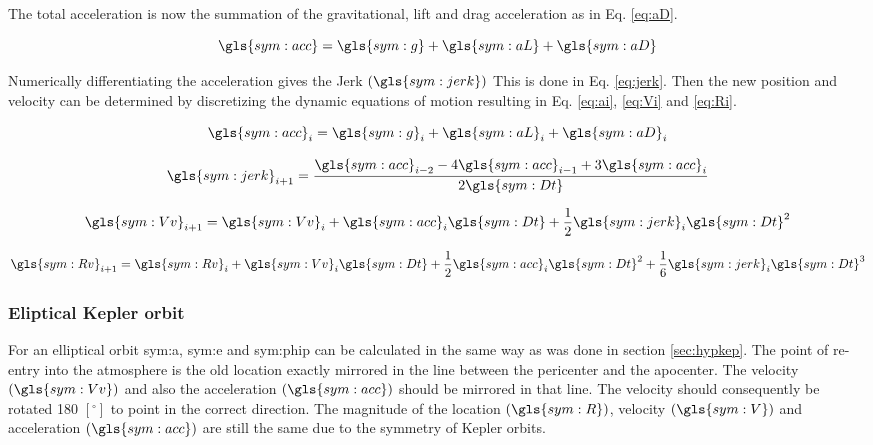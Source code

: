 The total acceleration is now the summation of the gravitational, lift and drag acceleration as in Eq. \ref{eq:aD}.

\begin{equation} \label{eq:acc}
\gls{sym:acc} = \gls{sym:g} + \gls{sym:aL} + \gls{sym:aD}
\end{equation}

Numerically differentiating the acceleration gives the Jerk $\left(\gls{sym:jerk}\right)$ This is done in Eq. \ref{eq:jerk}. Then the new position and velocity can be determined by discretizing the dynamic equations of motion resulting in Eq. \ref{eq:ai}, \ref{eq:Vi} and \ref{eq:Ri}.

\begin{equation} \label{eq:ai}
\gls{sym:acc}_i = \gls{sym:g}_i + \gls{sym:aL}_i + \gls{sym:aD}_i
\end{equation}

\begin{equation} \label{eq:jerk}
\gls{sym:jerk}_{i+1} = \frac{\gls{sym:acc}_{i-2} - 4\gls{sym:acc}_{i-1}+3\gls{sym:acc}_i}{2\gls{sym:Dt}}
\end{equation}

\begin{equation} \label{eq:Vi}
\gls{sym:Vv}_{i+1} = \gls{sym:Vv}_i + \gls{sym:acc}_i \gls{sym:Dt} + \frac{1}{2}\gls{sym:jerk}_i \gls{sym:Dt}^2
\end{equation}

\begin{equation} \label{eq:Ri}
\gls{sym:Rv}_{i+1} = \gls{sym:Rv}_i + \gls{sym:Vv}_i \gls{sym:Dt} + \frac{1}{2}\gls{sym:acc}_i \gls{sym:Dt}^2 + \frac{1}{6}\gls{sym:jerk}_i \gls{sym:Dt}^3
\end{equation}

\subsubsection{Eliptical Kepler orbit}
 \label{sec:eliptickep}
For an elliptical orbit \gls{sym:a}, \gls{sym:e} and \gls{sym:phip} can be calculated in the same way as was done in section \ref{sec:hypkep}. The point of re-entry into the atmosphere is the old location exactly mirrored in the line between the pericenter and the apocenter. The velocity $\left(\gls{sym:Vv}\right)$ and also the acceleration $\left(\gls{sym:acc}\right)$  should be mirrored in that line. The velocity should consequently be rotated 180 $\left[^\circ\right]$ to point in the correct direction. The magnitude of the location $\left(\gls{sym:R}\right)$, velocity $\left(\gls{sym:V}\right)$ and acceleration $\left(\gls{sym:acc}\right)$ are still the same due to the symmetry of Kepler orbits.

